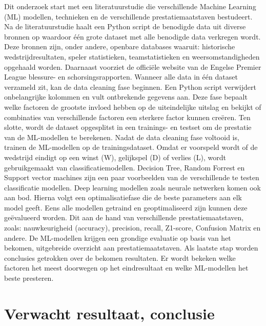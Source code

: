 Dit onderzoek start met een  literatuurstudie die verschillende Machine Learning (ML) modellen, technieken en de verschillende prestatiemaatstaven bestudeert.
Na de literatuurstudie haalt een Python script de benodigde data uit diverse bronnen op waardoor één grote dataset met alle benodigde data verkregen wordt. Deze bronnen zijn, onder andere, openbare databases waaruit: historische wedstrijdresultaten, speler statistieken, teamstatistieken en weersomstandigheden opgehaald worden. Daarnaast voorziet de officiële website van de Engelse Premier League blessure- en schorsingsrapporten.
Wanneer alle data in één dataset verzameld zit, kan de data cleaning fase beginnen. Een Python script verwijdert onbelangrijke kolommen en vult ontbrekende gegevens aan. Deze fase bepaalt welke factoren de grootste invloed hebben op de uiteindelijke uitslag en bekijkt of combinaties van verschillende factoren een sterkere factor kunnen creëren. Ten slotte, wordt de dataset opgesplitst in een trainings- en testset om de prestatie van de ML-modellen te berekenen.
Nadat de data cleaning fase voltooid is, trainen de ML-modellen op de trainingsdataset. Omdat er voorspeld wordt of de wedstrijd eindigt op een winst (W), gelijkspel (D) of verlies (L), wordt gebruikgemaakt van classificatiemodellen. Decision Tree, Random Forrest en Support vector machines zijn een paar voorbeelden van de verschillende te testen classificatie modellen. Deep learning modellen zoals neurale netwerken komen ook aan bod. Hierna volgt een optimalisatiefase die de beste parameters aan elk model geeft. 
Eens alle modellen getraind en geoptimaliseerd zijn kunnen deze geëvalueerd worden. Dit aan de hand van verschillende prestatiemaatstaven, zoals: nauwkeurigheid (accuracy), precision, recall, Z1-score, Confusion Matrix en andere. De ML-modellen krijgen een grondige evaluatie op basis van het bekomen, uitgebreide overzicht aan prestatiemaatstaven. 
Als laatste stap worden conclusies getrokken over de bekomen resultaten. Er wordt bekeken welke factoren het meest doorwegen op het eindresultaat en welke ML-modellen het beste presteren.

\section{Verwacht resultaat, conclusie}%
\label{sec:verwachte_resultaten}

